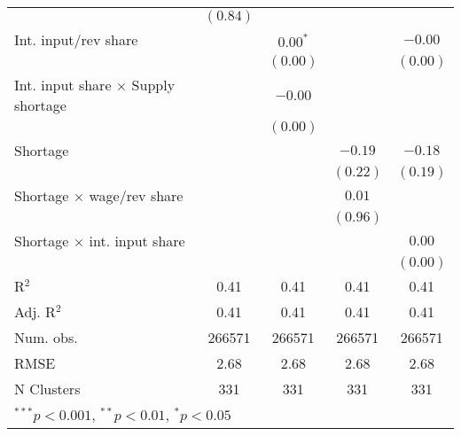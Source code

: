 \begin{tabular}{l c c c c }
                                          & $(0.84)$      &               &               &               \\
Int. input/rev share                      &               & $0.00^{*}$    &               & $-0.00$       \\
                                          &               & $(0.00)$      &               & $(0.00)$      \\
Int. input share $\times$ Supply shortage &               & $-0.00$       &               &               \\
                                          &               & $(0.00)$      &               &               \\
Shortage                                  &               &               & $-0.19$       & $-0.18$       \\
                                          &               &               & $(0.22)$      & $(0.19)$      \\
Shortage $\times$ wage/rev share          &               &               & $0.01$        &               \\
                                          &               &               & $(0.96)$      &               \\
Shortage $\times$ int. input share        &               &               &               & $0.00$        \\
                                          &               &               &               & $(0.00)$      \\
\midrule
R$^2$                                     & 0.41          & 0.41          & 0.41          & 0.41          \\
Adj. R$^2$                                & 0.41          & 0.41          & 0.41          & 0.41          \\
Num. obs.                                 & 266571        & 266571        & 266571        & 266571        \\
RMSE                                      & 2.68          & 2.68          & 2.68          & 2.68          \\
N Clusters                                & 331           & 331           & 331           & 331           \\
\bottomrule
\multicolumn{5}{l}{\tiny{$^{***}p<0.001$, $^{**}p<0.01$, $^*p<0.05$}}
\end{tabular}
